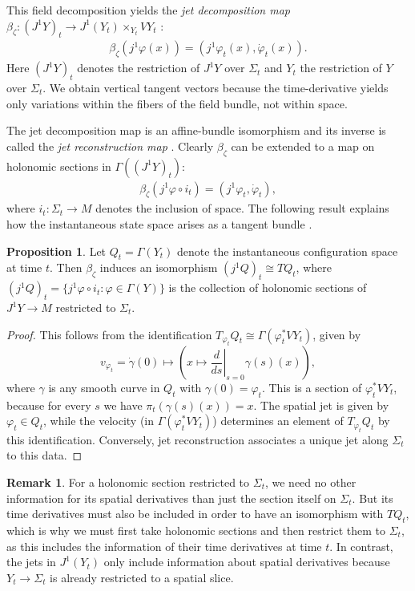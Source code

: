 \documentclass{article}
\theoremstyle{definition}
\newtheorem{remark}[definition]{Remark}
\newtheorem{proposition}[definition]{Proposition}
\begin{document}
This field decomposition yields the \textit{jet decomposition map} $\beta_\zeta\colon (J^1Y)_t\to J^1(Y_t)\times_{Y_t} VY_t$ \cite{gotayMomentumMapsClassical2004a}:
\begin{align*}
    \beta_\zeta(j^1\varphi(x))=(j^1\varphi_t(x),\dot{\varphi}_t(x)).
\end{align*}
Here $(J^1Y)_t$ denotes the restriction of $J^1Y$ over $\Sigma_t$ and $Y_t$ the restriction of $Y$ over $\Sigma_t$. We obtain vertical tangent vectors because the time-derivative yields only variations within the fibers of the field bundle, not within space. 

The jet decomposition map is an affine-bundle isomorphism and its inverse is called the \textit{jet reconstruction map} \cite{gotayMomentumMapsClassical2004a}. Clearly $\beta_\zeta$ can be extended to a map on holonomic sections in $\Gamma((J^1Y)_t)$:
\begin{align*}
    \beta_\zeta(j^1\varphi\circ i_t)=(j^1\varphi_t,\dot{\varphi}_t),
\end{align*}
where $i_t\colon \Sigma_t\to M$ denotes the inclusion of space. The following result explains how the instantaneous state space arises as a tangent bundle \cite[Corollary 6.2]{gotayMomentumMapsClassical2004a}.
\begin{proposition}\label{prop:crucialisom}
    Let $Q_t=\Gamma(Y_t)$ denote the instantaneous configuration space at time $t$. Then $\beta_\zeta$ induces an isomorphism $(j^1Q)_t\cong TQ_t$, where $(j^1Q)_t=\{j^1\varphi\circ i_t:\varphi\in\Gamma(Y)\}$ is the collection of holonomic sections of $J^1Y\to M$ restricted to $\Sigma_t$. 
\end{proposition}

\begin{proof}
This follows from the identification $T_{\varphi_t}Q_t
\cong
\Gamma(\varphi_t^*VY_t)$, given by
\[
v_{\varphi_t}=\dot\gamma(0)\mapsto
\left(x\mapsto \left.\frac{d}{ds}\right|_{s=0}\gamma(s)(x)\right),
\]
where \(\gamma\) is any smooth curve in \(Q_t\) with \(\gamma(0)=\varphi_t\). This is a section of \(\varphi_t^*VY_t\), because for every \(s\) we have $\pi_t(\gamma(s)(x))=x$. The spatial jet is given by \(\varphi_t\in Q_t\), while the velocity (in $\Gamma(\varphi_t^*VY_t)$) determines an element of \(T_{\varphi_t}Q_t\) by this identification. Conversely, jet reconstruction associates a unique jet along \(\Sigma_t\) to this data.
\end{proof}

\begin{remark}
For a holonomic section restricted to $\Sigma_t$, we need no other information for its spatial derivatives than just the section itself on $\Sigma_t$. But its time derivatives must also be included in order to have an isomorphism with $TQ_t$, which is why we must first take holonomic sections and then restrict them to $\Sigma_t$, as this includes the information of their time derivatives at time $t$. In contrast, the jets in $J^1(Y_t)$ only include information about spatial derivatives because $Y_t\to\Sigma_t$ is already restricted to a spatial slice.
\end{remark}
\end{document}
